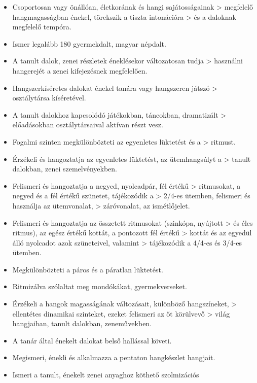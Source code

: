 \begin{itemize}
\item
  Csoportosan vagy önállóan, életkorának és hangi sajátosságainak
  \textgreater{} megfelelő hangmagasságban énekel, törekszik a tiszta
  intonációra \textgreater{} és a daloknak megfelelő tempóra.
\item
  Ismer legalább 180 gyermekdalt, magyar népdalt.
\item
  A tanult dalok, zenei részletek éneklésekor változatosan tudja
  \textgreater{} használni hangerejét a zenei kifejezésnek megfelelően.
\item
  Hangszerkíséretes dalokat énekel tanára vagy hangszeren játszó
  \textgreater{} osztálytársa kíséretével.
\item
  A tanult dalokhoz kapcsolódó játékokban, táncokban, dramatizált
  \textgreater{} előadásokban osztálytársaival aktívan részt vesz.
\item
  Fogalmi szinten megkülönbözteti az egyenletes lüktetést és a
  \textgreater{} ritmust.
\item
  Érzékeli és hangoztatja az egyenletes lüktetést, az ütemhangsúlyt a
  \textgreater{} tanult dalokban, zenei szemelvényekben.
\item
  Felismeri és hangoztatja a negyed, nyolcadpár, fél értékű
  \textgreater{} ritmusokat, a negyed és a fél értékű szünetet,
  tájékozódik a \textgreater{} 2/4-es ütemben, felismeri és használja az
  ütemvonalat, \textgreater{} záróvonalat, az ismétlőjelet.
\item
  Felismeri és hangoztatja az összetett ritmusokat (szinkópa, nyújtott
  \textgreater{} és éles ritmus), az egész értékű kottát, a pontozott
  fél értékű \textgreater{} kottát és az egyedül álló nyolcadot azok
  szüneteivel, valamint \textgreater{} tájékozódik a 4/4-es és 3/4-es
  ütemben.
\item
  Megkülönbözteti a páros és a páratlan lüktetést.
\item
  Ritmizálva szólaltat meg mondókákat, gyermekverseket.
\item
  Érzékeli a hangok magasságának változásait, különböző hangszíneket,
  \textgreater{} ellentétes dinamikai szinteket, ezeket felismeri az őt
  körülvevő \textgreater{} világ hangjaiban, tanult dalokban,
  zeneművekben.
\item
  A tanár által énekelt dalokat belső hallással követi.
\item
  Megismeri, énekli és alkalmazza a pentaton hangkészlet hangjait.
\item
  Ismeri a tanult, énekelt zenei anyaghoz köthető szolmizációs

\end{itemize}

